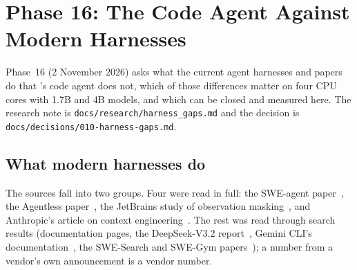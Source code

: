 \section{Phase 16: The Code Agent Against Modern Harnesses}
\label{sec:phase16}

Phase~16 (2 November 2026) asks what the current agent harnesses and papers do that \Sys{}'s code agent does not, which of those
differences matter on four CPU cores with 1.7B and 4B models, and which can be closed and measured here. The research note is
\texttt{docs/research/harness\_gaps.md} and the decision is \texttt{docs/decisions/010-harness-gaps.md}.

\subsection{What modern harnesses do}

The sources fall into two groups. Four were read in full: the SWE-agent paper~\cite{yang2024sweagent}, the Agentless
paper~\cite{xia2024agentless}, the JetBrains study of observation masking~\cite{lindenbauer2025complexity}, and Anthropic's article on
context engineering~\cite{anthropic2025context}. The rest was read through search results (documentation pages, the DeepSeek-V3.2
report~\cite{deepseek2025v32}, Gemini CLI's documentation~\cite{geminicli2026docs}, the SWE-Search and SWE-Gym
papers~\cite{antoniades2025sweSearch,pan2024swegym}); a number from a vendor's own announcement is a vendor number.

